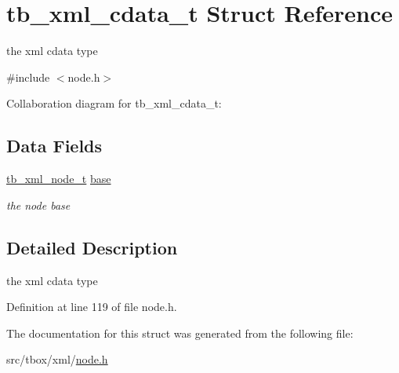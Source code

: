 \hypertarget{structtb__xml__cdata__t}{\section{tb\-\_\-xml\-\_\-cdata\-\_\-t Struct Reference}
\label{structtb__xml__cdata__t}
}


the xml cdata type  




{\ttfamily \#include $<$node.\-h$>$}



Collaboration diagram for tb\-\_\-xml\-\_\-cdata\-\_\-t\-:
\subsection*{Data Fields}
\begin{DoxyCompactItemize}
\item 
\hypertarget{structtb__xml__cdata__t_af42db47f28a4e4743e6ef8f4be39e3b4}{\hyperlink{structtb__xml__node__t}{tb\-\_\-xml\-\_\-node\-\_\-t} \hyperlink{structtb__xml__cdata__t_af42db47f28a4e4743e6ef8f4be39e3b4}{base}}\label{structtb__xml__cdata__t_af42db47f28a4e4743e6ef8f4be39e3b4}

\begin{DoxyCompactList}\small\item\em the node base \end{DoxyCompactList}\end{DoxyCompactItemize}


\subsection{Detailed Description}
the xml cdata type 

Definition at line 119 of file node.\-h.



The documentation for this struct was generated from the following file\-:\begin{DoxyCompactItemize}
\item 
src/tbox/xml/\hyperlink{node_8h}{node.\-h}\end{DoxyCompactItemize}
